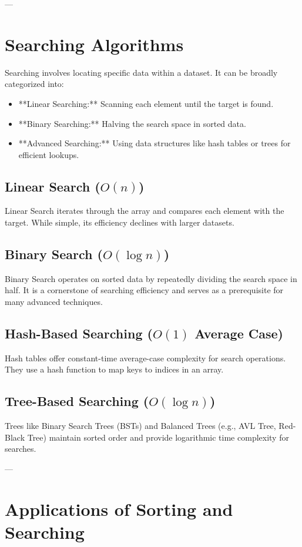 ---

\section*{Searching Algorithms}

Searching involves locating specific data within a dataset. It can be broadly categorized into:
\begin{itemize}
    \item **Linear Searching:** Scanning each element until the target is found.
    \item **Binary Searching:** Halving the search space in sorted data.
    \item **Advanced Searching:** Using data structures like hash tables or trees for efficient lookups.
\end{itemize}

\subsection*{Linear Search (\( O(n) \))}
Linear Search iterates through the array and compares each element with the target. While simple, its efficiency declines with larger datasets.

\subsection*{Binary Search (\( O(\log n) \))}
Binary Search operates on sorted data by repeatedly dividing the search space in half. It is a cornerstone of searching efficiency and serves as a prerequisite for many advanced techniques.

\subsection*{Hash-Based Searching (\( O(1) \) Average Case)}
Hash tables offer constant-time average-case complexity for search operations. They use a hash function to map keys to indices in an array.

\subsection*{Tree-Based Searching (\( O(\log n) \))}
Trees like Binary Search Trees (BSTs) and Balanced Trees (e.g., AVL Tree, Red-Black Tree) maintain sorted order and provide logarithmic time complexity for searches.

---

\section*{Applications of Sorting and Searching}

